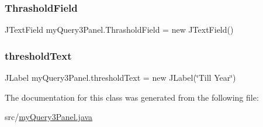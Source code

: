 \subsubsection{\texorpdfstring{Thrashold\+Field}{ThrasholdField}}
{\footnotesize\ttfamily J\+Text\+Field my\+Query3\+Panel.\+Thrashold\+Field = new J\+Text\+Field()\hspace{0.3cm}{\ttfamily [private]}}

\hypertarget{classmy_query3_panel_a1faf4fe8c937b0ad364addc3908b094f}{}\label{classmy_query3_panel_a1faf4fe8c937b0ad364addc3908b094f} 
\subsubsection{\texorpdfstring{threshold\+Text}{thresholdText}}
{\footnotesize\ttfamily J\+Label my\+Query3\+Panel.\+threshold\+Text = new J\+Label(\char`\"{}Till Year\char`\"{})\hspace{0.3cm}{\ttfamily [private]}}



The documentation for this class was generated from the following file\+:\begin{DoxyCompactItemize}
\item 
src/\hyperlink{my_query3_panel_8java}{my\+Query3\+Panel.\+java}\end{DoxyCompactItemize}
